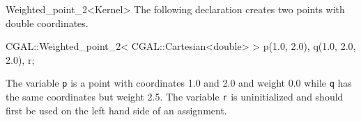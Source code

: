\begin{ccRefClass} {Weighted_point_2<Kernel>}
The following declaration creates two points with  double coordinates.

\begin{cprog}

  CGAL::Weighted_point_2< CGAL::Cartesian<double> > p(1.0, 2.0), q(1.0, 2.0, 2.0), r;
\end{cprog} 

The variable \texttt{p} is a point with 
coordinates 1.0 and 2.0 and weight 0.0 while \texttt{q} has the same 
coordinates but weight 2.5.
The variable {\tt r} is uninitialized and should first be used on 
the left hand side of an assignment. 

\ccSeeAlso
{} \\

\end{ccRefClass} 
